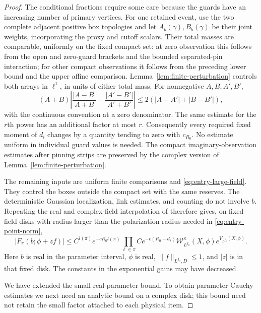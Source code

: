 \begin{proof}
The conditional fractions require some care because the guards have
an increasing number of primary vertices.  For one retained event,
use the two complete adjacent positive box topologies and let
$A_b(\gamma),B_b(\gamma)$ be their joint weights, incorporating the
proxy and cutoff scalars.  Their total masses are comparable, uniformly
on the fixed compact set: at zero observation this follows from the
open and zero-guard brackets and the bounded separated-pin interaction;
for other compact observations it follows from the preceding lower
bound and the upper affine comparison.  Lemma~\ref{lem:finite-perturbation}
controls both arrays in $\ell^1$, in units of either total mass.
For nonnegative $A,B,A',B'$,
\[
 (A+B)\left|
 \frac{|A-B|}{A+B}-\frac{|A'-B'|}{A'+B'}\right|
 \le2(|A-A'|+|B-B'|),
\]
with the continuous convention at a zero denominator.  The same
estimate for the $r$th power has an additional factor at most $r$.
Consequently every required fixed moment of $d_i$ changes by a quantity
tending to zero with $c_{R_0}$.  No estimate uniform in individual guard
values is needed.  The compact imaginary-observation estimates after
pinning strips are preserved by the complex version of
Lemma~\ref{lem:finite-perturbation}.

The remaining inputs are uniform finite comparisons and
\eqref{eq:entry-large-field}.  They control the boxes outside the
compact set with the same reserves.  The deterministic Gaussian
localization, link estimates, and counting do not involve $b$.
Repeating the real and complex-field interpolation of
\cite[Lemma~4.7, Equations~(85)--(89)]{F} therefore gives, on fixed field disks with radius
larger than the polarization radius needed in
\eqref{eq:entry-point-norm},
\begin{equation}\label{eq:entry-real-pattern}
 |F_\pi(b;\phi+zf)|
 \le C^{l(\pi)}e^{-cR_0l(\pi)}
       \prod_{\ell\in\pi}Ce^{-c(R_0+d_\ell)}
       \mathscr W_{L^{j_0}}^\kappa(X,\phi)e^{V_{L^{j_0}}(X,\phi)}.
\end{equation}
Here $b$ is real in the parameter interval, $\phi$ is real,
$\|f\|_{L^{j_0},D}\le1$, and $|z|$ is in that fixed disk.
The constants in the exponential gains may have decreased.

We have extended the small real-parameter bound.  To obtain parameter
Cauchy estimates we next need an analytic bound on a complex disk; this
bound need not retain the small factor attached to each physical item.


\end{proof}
